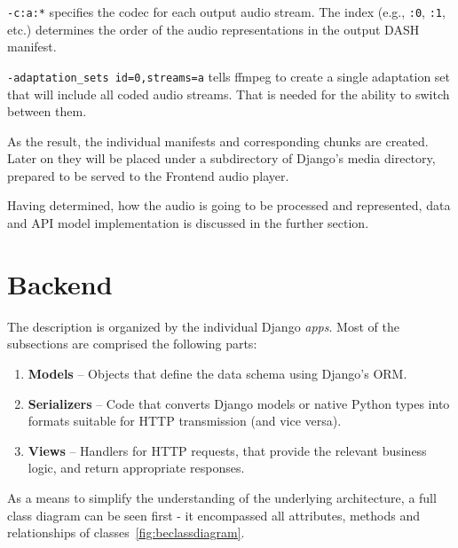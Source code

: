 \texttt{-c:a:*} specifies the codec for each output audio stream.
The index (e.g., \texttt{:0}, \texttt{:1}, etc.) determines the order of the audio representations
in the output DASH manifest.

\texttt{-adaptation\_sets id=0,streams=a} tells ffmpeg to create a single adaptation set that will include all
coded audio streams. That is needed for the ability to switch between them.

As the result, the individual manifests and corresponding chunks are created.
Later on they will be placed under a subdirectory
of Django's media directory, prepared to be served to the Frontend audio player.

Having determined, how the audio is going to be processed and represented, data and API model
implementation is discussed in the further section.


\section{Backend}
The description is organized by the individual Django \textit{apps}.
Most of the subsections are comprised the following parts:

\begin{enumerate}
    \item \textbf{Models} – Objects that define the data schema using Django's ORM.
    \item \textbf{Serializers} – Code that converts Django models or native Python types into
    formats suitable for HTTP transmission (and vice versa).
    \item \textbf{Views} – Handlers for HTTP requests,
    that provide the relevant business logic, and return appropriate responses.
\end{enumerate}

As a means to simplify the understanding of the underlying architecture, a full class diagram can be
seen first - it encompassed all attributes, methods and relationships of classes~\ref{fig:beclassdiagram}.

